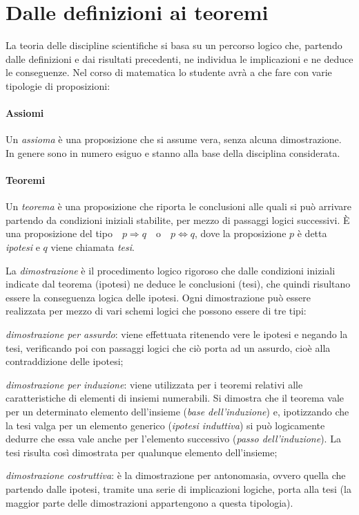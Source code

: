 \section{Dalle definizioni ai teoremi}

La teoria delle discipline scientifiche si basa su un percorso logico che, partendo dalle definizioni e dai risultati precedenti, ne individua le implicazioni e ne deduce le conseguenze. Nel corso di matematica lo studente avrà a che fare con varie tipologie di proposizioni:

\paragraph{Assiomi}
Un \emph{assioma} è una proposizione che si assume vera, senza alcuna dimostrazione. In genere sono in numero esiguo e stanno alla base della disciplina considerata.

\paragraph{Teoremi}
Un \emph{teorema} è una proposizione che riporta le conclusioni alle quali si può arrivare partendo da condizioni iniziali stabilite, per mezzo di passaggi logici successivi. \`E una proposizione del tipo\ \  $p\Rightarrow q$\ \ o\ \ $p \Leftrightarrow q$, dove la proposizione $p$ è detta \emph{ipotesi} e $q$ viene chiamata \emph{tesi}.

La \emph{dimostrazione} è il procedimento logico rigoroso che dalle condizioni iniziali indicate dal teorema (ipotesi) ne deduce le conclusioni (tesi), che quindi risultano essere la conseguenza logica delle ipotesi.
Ogni dimostrazione può essere realizzata per mezzo di vari schemi logici che possono essere di tre tipi:

\begin{itemize*}
\item \emph{dimostrazione per assurdo}: viene effettuata ritenendo vere le ipotesi e negando la tesi, verificando poi con passaggi logici che ciò porta ad un assurdo, cioè alla contraddizione delle ipotesi;
\item \emph{dimostrazione per induzione}: viene utilizzata per i teoremi relativi alle caratteristiche di elementi di insiemi numerabili. Si dimostra che il teorema vale per un determinato elemento dell'insieme (\emph{base dell'induzione}) e, ipotizzando che la tesi valga per un elemento generico (\emph{ipotesi induttiva}) si può logicamente dedurre che essa vale anche per l'elemento successivo (\emph{passo dell'induzione}). La tesi risulta così dimostrata per qualunque elemento dell'insieme;
\item \emph{dimostrazione costruttiva}: è la dimostrazione per antonomasia, ovvero quella che partendo dalle ipotesi, tramite una serie di implicazioni logiche, porta alla tesi (la maggior parte delle dimostrazioni appartengono a questa tipologia).
\end{itemize*}

